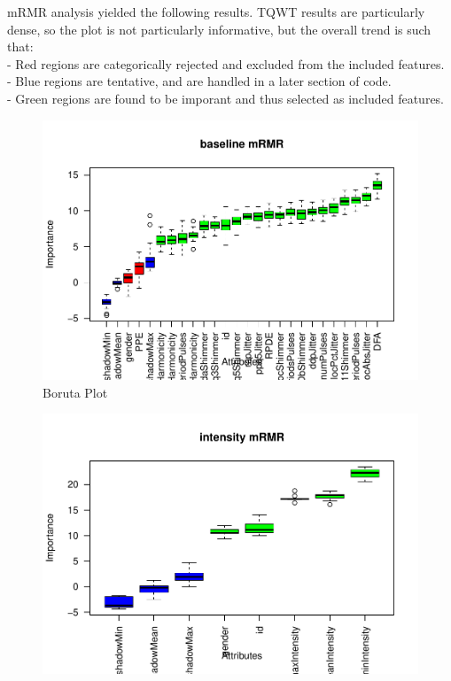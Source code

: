 \documentclass[
]{article}
\begin{document}
mRMR analysis yielded the following results. TQWT results are particularly dense, so the plot is not particularly informative, but the overall trend is such that:\\
- Red regions are categorically rejected and excluded from the included features.\\
- Blue regions are tentative, and are handled in a later section of code.\\
- Green regions are found to be imporant and thus selected as included features.

\begin{landscape}

\begin{figure}

{\centering \includegraphics[width=1\linewidth,height=1\textheight]{figure/borutaPlot-1} 

}

\caption{\label{fig:borutaPlot}Boruta Plot}\label{fig:borutaPlot-1}
\end{figure}
\begin{figure}

{\centering \includegraphics[width=1\linewidth,height=1\textheight]{figure/borutaPlot-2} 

}
\end{figure}
\end{landscape}
\end{document}
